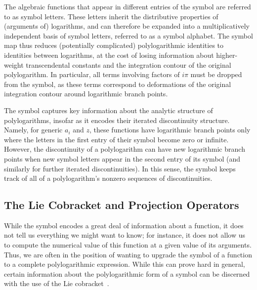 \documentclass[11pt]{article}
\begin{document}
The algebraic functions that appear in different entries of the symbol are referred to as symbol letters. These letters inherit the distributive properties of (arguments of) logarithms, and can therefore be expanded into a multiplicatively independent basis of symbol letters, referred to as a symbol alphabet. The symbol map thus reduces (potentially complicated) polylogarithmic identities to identities between logarithms, at the cost of losing information about higher-weight transcendental constants and the integration contour of the original polylogarithm. In particular, all terms involving factors of $i\pi$ must be dropped from the symbol, as these terms correspond to deformations of the original integration contour around logarithmic branch points.
 
The symbol captures key information about the analytic structure of polylogarithms, insofar as it encodes their iterated discontinuity structure. Namely, for generic $a_i$ and $z$, these functions have logarithmic branch points only where the letters in the first entry of their symbol become zero or infinite. However, the discontinuity of a polylogarithm can have new logarithmic branch points when new symbol letters appear in the second entry of its symbol (and similarly for further iterated discontinuities). In this sense, the symbol keeps track of all of a polylogarithm's nonzero sequences of discontinuities. 



\subsection{The Lie Cobracket and Projection Operators}
\label{sec:lie_cobracket}

While the symbol encodes a great deal of information about a function, it does not tell us everything we might want to know; for instance, it does not allow us to compute the numerical value of this function at a given value of its arguments. Thus, we are often in the position of wanting to upgrade the symbol of a function to a complete polylogarithmic expression. While this can prove hard in general, certain information about the polylogarithmic form of a symbol can be discerned with the use of the Lie cobracket~\cite{Golden:2013xva}. 
\end{document}

